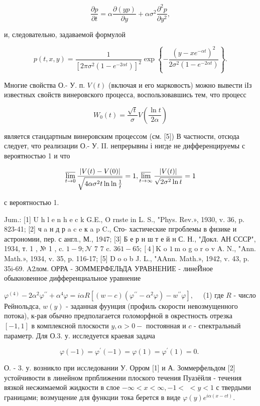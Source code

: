 \documentclass[10pt]{article}
\begin{document}
\[
\frac{\partial p}{\partial t}=\alpha \frac{\partial(y p)}{\partial y}+\alpha \sigma^{2} \frac{\partial^{2} p}{\partial y^{2}},
\]

и, следовательно, задаваемой формулой

\[
p(t, x, y)=\frac{1}{\left[2 \pi \sigma^{2}\left(1-e^{-2 \alpha t}\right)\right]^{2}} \exp \left\{-\frac{\left(y-x e^{-\alpha t}\right)^{2}}{2 \sigma^{2}\left(1-e^{-2 \alpha t}\right)}\right\} .
\]

Многие свойства О.- У. п. $V(t)$ (включая и его марковость) можно вывести іІз известных свойств винеровского процесса, воспользовавшись тем, что процесс

\[
W_{0}(t)=\frac{\sqrt{t}}{\sigma} V\left(\frac{\ln t}{2 \alpha}\right)
\]

является стандартным винеровским процессом (см. [5]) В частности, отсюда следует, что реализации О.- У. II. непрерывны і нигде не дифференцируемы с вероятностью 1 и что

\[
\varlimsup_{t \rightarrow 0} \frac{|V(t)-V(0)|}{\sqrt{4 \alpha \sigma^{2} t \ln \ln \frac{1}{t}}}=1, \varlimsup_{t \rightarrow \infty} \frac{|V(t)|}{\sqrt{2 \sigma^{2} \ln t}}=1
\]

с вероятностью 1.

Jum.: [1] U h l e n h e c k G.E., O rnste in L. S., "Phys. Rev.», 1930, v. 36, p. 823-41; [2] ч a н д р a c e к a p C., Сто-
хастические пгроблемы в физике и астрономии, пер. с англ., М., 1947; [3] Б е р н ш т е й н С. Н., "Докл. АН СССР", 1934, т. 1 , № 1 , c. $1-9 ; \mathcal{N}$ 7 7 c. $361-65 ;[4] \mathrm{K}$ o $1 \mathrm{~m}$ o g o r o v A. N., "Ann. Math.», 1934, v. 35, p. 116-17; [5] D o o b J. L., "AAnn.
Math.», 1942, v. 43, p. 35i-69. A2лом. ОРРА - ЗОММЕРФЕЛЬДА УРАВНЕНИЕ - линеЙное обыкновенное дифференциальное уравнение

$\varphi^{(4)}-2 \alpha^{2} \varphi^{\prime \prime}+\alpha^{4} \varphi=i \alpha R\left[(w-c)\left(\varphi^{\prime \prime}-\alpha^{2} \varphi\right)-w^{\prime \prime} \varphi\right], \quad$ (1) где $R$ - число Рейнольдса, $w(y)$ - заданная фуунция (профиль скорости невозмущенного потока), к-рая обычно предполагается голоморфной в окрестность отрезка $[-1,1]$ в комплексной плоскости $y, \alpha>0-$ постоянная и $c$ - спектральный параметр. Для О.3. у. исследуется краевая задача

\[
\varphi(-1)=\varphi^{\prime}(-1)=\varphi(1)=\varphi^{\prime}(1)=0 \text {. }
\]

О. - 3. у. возникло при исследовании У. Орром [1] и А. Зоммерфельдом [2] устойчивости в линейном прпближении плоского течения Пуазёйля - течения вязкой несжимаемой жидкости в слое $-\infty<x<\infty,-1<$ $<y<1$ с твердыми границами; возмущение для функции тока берется в виде $\varphi(y) e^{i \alpha(x-c t)}$.
\end{document}
